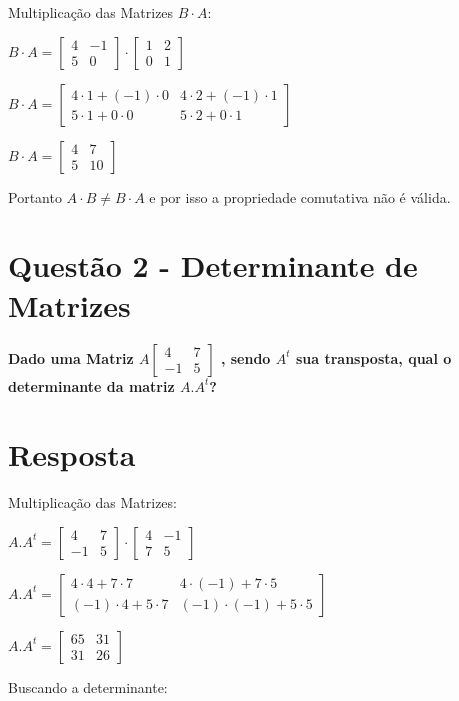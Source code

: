 \documentclass[a4paper, 12pt]{article}
\begin{document}
Multiplicação das Matrizes $B \cdot A$:
\begin{center}
  $B \cdot A =
    \begin{bmatrix}
      4 & -1\\
      5 & 0
    \end{bmatrix}
    \cdot
    \begin{bmatrix}
      1 & 2 \\
      0 & 1
    \end{bmatrix}$

    $B \cdot A =
    \begin{bmatrix}
      4 \cdot 1 + (-1) \cdot 0 & 4 \cdot 2 + (-1) \cdot 1 \\
      5 \cdot 1 + 0 \cdot 0 & 5 \cdot 2 + 0 \cdot 1
    \end{bmatrix}
    $

    $B \cdot A = 
    \begin{bmatrix}
      4 & 7 \\
      5 & 10 
    \end{bmatrix}
    $
\end{center}

Portanto $ A \cdot B \neq B \cdot A $ e por isso a propriedade comutativa não é válida.
\newpage

\section*{Questão 2 - Determinante de Matrizes}
  {\bfseries Dado uma Matriz 
  $A
  \begin{bmatrix}
    4 & 7\\
    -1 & 5
  \end{bmatrix}$
  , sendo $A^t$ sua transposta, qual o determinante da matriz $A.A^t$? 
  }

  \section*{Resposta}
    Multiplicação das Matrizes: \\
    \begin{center}
      $A.A^t = 
        \begin{bmatrix}
          4 & 7\\
          -1 & 5
        \end{bmatrix} 
        \cdot
        \begin{bmatrix}
          4 & -1 \\
          7 & 5
        \end{bmatrix}
      $
      
      $A.A^t = 
        \begin{bmatrix}
          4 \cdot 4 + 7 \cdot 7 & 4 \cdot (-1) + 7 \cdot 5 \\
          (-1) \cdot 4 + 5 \cdot 7 & (-1) \cdot (-1) + 5 \cdot 5
        \end{bmatrix}
      $

      $A.A^t = 
        \begin{bmatrix}
          65 & 31 \\
          31 & 26
        \end{bmatrix}
      $
    \end{center}
    Buscando a determinante:
\end{document}
